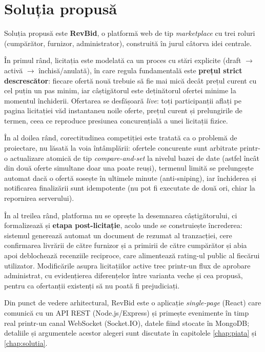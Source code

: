 \section{Soluția propusă}

Soluția propusă este \textbf{RevBid}, o platformă web de tip \textit{marketplace} cu trei roluri (cumpărător, furnizor, administrator), construită în jurul câtorva idei centrale.

În primul rând, licitația este modelată ca un proces cu stări explicite (draft $\to$ activă $\to$ închisă/anulată), în care regula fundamentală este \textbf{prețul strict descrescător}: fiecare ofertă nouă trebuie să fie mai mică decât prețul curent cu cel puțin un pas minim, iar câștigătorul este deținătorul ofertei minime la momentul închiderii. Ofertarea se desfășoară \textit{live}: toți participanții aflați pe pagina licitației văd instantaneu noile oferte, prețul curent și prelungirile de termen, ceea ce reproduce presiunea concurențială a unei licitații fizice.

În al doilea rând, corectitudinea competiției este tratată ca o problemă de proiectare, nu lăsată la voia întâmplării: ofertele concurente sunt arbitrate printr-o actualizare atomică de tip \textit{compare-and-set} la nivelul bazei de date (astfel încât din două oferte simultane doar una poate reuși), termenul limită se prelungește automat dacă o ofertă sosește în ultimele minute (anti-sniping), iar închiderea și notificarea finalizării sunt idempotente (nu pot fi executate de două ori, chiar la repornirea serverului).

În al treilea rând, platforma nu se oprește la desemnarea câștigătorului, ci formalizează și \textbf{etapa post-licitație}, acolo unde se construiește încrederea: sistemul generează automat un document de rezumat al tranzacției, cere confirmarea livrării de către furnizor și a primirii de către cumpărător și abia apoi deblochează recenziile reciproce, care alimentează rating-ul public al fiecărui utilizator. Modificările asupra licitațiilor active trec printr-un flux de aprobare administrat, cu evidențierea diferențelor între varianta veche și cea propusă, pentru ca ofertanții existenți să nu poată fi prejudiciați.

Din punct de vedere arhitectural, RevBid este o aplicație \textit{single-page} (React) care comunică cu un API REST (Node.js/Express) și primește evenimente în timp real printr-un canal WebSocket (Socket.IO), datele fiind stocate în MongoDB; detaliile și argumentele acestor alegeri sunt discutate în capitolele \ref{chap:piata} și \ref{chap:solutia}.

